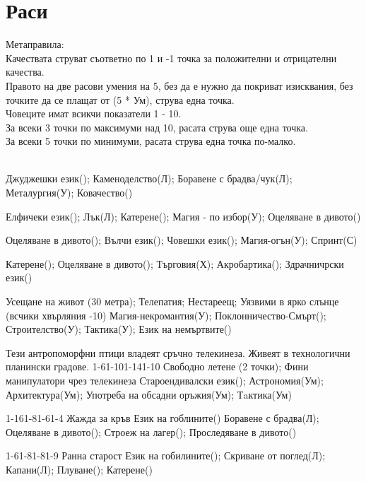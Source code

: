 \section{Раси}
Метаправила:  \\
Качествата струват съответно по 1 и -1 точка за положителни и отрицателни качества.  \\
Правото на две расови умения на 5, без да е нужно да покриват изисквания, без точките да се плащат от (5 * Ум), струва една точка.  \\
Човеците имат всикчи показатели 1 - 10.  \\
За всеки 3 точки по максимуми над 10, расата струва още една точка.  \\
За всеки 5 точки по минимуми, расата струва една точка по-малко.  \\
\\
\begin{multicols}{2}

{
Джуджешки език();
Каменоделство(Л);
Боравене с брадва/чук(Л);
Металургия(У);
Ковачество()
}

{
Елфичеки език();
Лък(Л);
Катерене();
Магия - по избор(У);
Оцеляване в дивото()
}

{
Оцеляване в дивото();
Вълчи език();
Човешки език();
Магия-огън(У);
Спринт(С)
}

{
Катерене();
Оцеляване в дивото();
Търговия(Х);
Акробартика();
Здрачничрски език()
}

{
Усещане на живот (30 метра);
Телепатия;
Нестареещ;
Уязвими в ярко слънце (всчики хвърляния -10)
}
{
Магия-некромантия(У);
Поклонничество-Смърт();
Строителство(У);
Тактика(У);
Език на немъртвите()
}

{Тези антропоморфни птици владеят сръчно телекинеза. Живеят в технологични планински градове.}
{1-6}{1-10}{1-14}{1-10}
{
Свободно летене (2 точки);
Фини манипулатори чрез телекинеза
}
{
Староендивалски език();
Астрономия(Ум);
Архитектура(Ум);
Употреба на обсадни оръжия(Ум);
Тaктика(Ум)
}

{}
{1-16}{1-8}{1-6}{1-4}
{
Жажда за кръв
}
{
Език на гоблините()
Боравене с брадва(Л);
Оцеляване в дивото();
Строеж на лагер();
Проследяване в дивото()
}

{}
{1-6}{1-8}{1-8}{1-9}
{
Ранна старост
}
{
Език на гобилините();
Скриване от поглед(Л);
Капани(Л);
Плуване();
Катерене()
}

\end{multicols}
